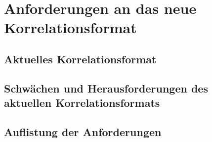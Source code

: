 \chapter{Anforderungen an das neue Korrelationsformat}\label{ch:anforderungen}


\section{Aktuelles Korrelationsformat}


\section{Schwächen und Herausforderungen des aktuellen Korrelationsformats}


\section{Auflistung der Anforderungen}
